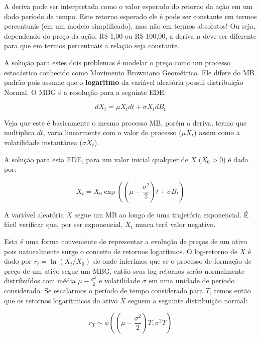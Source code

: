\documentclass[]{book}
\theoremstyle{definition}
\theoremstyle{definition}
\theoremstyle{definition}
\theoremstyle{remark}
\begin{document}
A deriva pode ser interpretada como o valor esperado do retorno da ação
em um dado período de tempo. Este retorno esperado ele é pode ser
constante em termos percentuais (em um modelo simplificado), mas não em
termos absolutos! Ou seja, dependendo do preço da ação, R\$ 1,00 ou R\$
100,00, a deriva \(\mu\) deve ser diferente para que em termos
percentuais a relação seja constante.

A solução para estes dois problemas é modelar o preço como um processo
estocástico conhecido como Movimento Browniano Geométrico. Ele difere do
MB padrão pois assume que o \textbf{logaritmo} da variável aleatória
possui distribuição Normal. O MBG é a resolução para a seguinte EDE:

\begin{equation}
dX_t = \mu X_t dt + \sigma X_t dB_t
\label{eq:mbg}
\end{equation}

Veja que este é basicamente o mesmo processo MB, porém a deriva, termo
que multiplica \(dt\), varia linearmente com o valor do processo
(\(\mu X_t\)) assim como a volatilidade instantânea (\(\sigma X_t\)).

A solução para esta EDE, para um valor inicial qualquer de \(X\)
(\(X_0 > 0\)) é dada por:

\begin{equation}
X_t = X_0\exp\left(\left(\mu-\frac{\sigma^2}{2}\right)t+\sigma B_t\right)
\label{eq:mbgsol}
\end{equation}

A variável aleatória \(X\) segue um MB ao longo de uma trajetória
exponencial. É fácil verificar que, por ser exponencial, \(X_t\) nunca
terá valor negativo.

Esta é uma forma conveniente de representar a evolução de preços de um
ativo pois naturalmente surge o conceito de retornos logarítmos. O
log-retorno de \(X\) é dado por \(r_t=\ln(X_t/X_0)\) de onde inferimos
que se o processo de formação de preço de um ativo segue um MBG, então
seus log-retornos serão normalmente distribuídos com média
\(\mu-\frac{\sigma^2}{2}\) e volatilidade \(\sigma\) em uma unidade de
período considerado. Se escalarmos o período de tempo considerado para
\(T\), temos então que os retornos logarítmicos do ativo \(X\) seguem a
seguinte distribuição normal:

\begin{equation}
r_T \sim\phi\left(\left(\mu-\frac{\sigma^2}{2}\right)T, \sigma^2T\right)
\label{eq:rT}
\end{equation}
\end{document}
